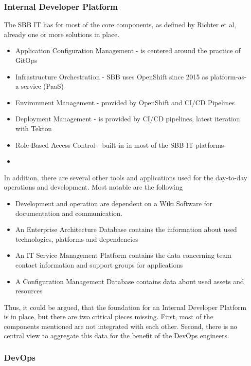 \documentclass[a4paper,12pt]{article}
\begin{document}
    \subsubsection{Internal Developer Platform}
    The SBB IT has for most of the core components, as defined by Richter et al\cite{richteretal}, already one or more solutions
    in place.
    \begin{itemize}
        \item Application Configuration Management - is centered around the practice of GitOps\cite{hashicorpvault}
        \item Infrastructure Orchestration - SBB uses OpenShift since 2015\cite{rhsbbopenshift} as platform-as-a-service (PaaS)
        \item Environment Management - provided by OpenShift and CI/CD Pipelines
        \item Deployment Management - is provided by CI/CD pipelines, latest iteration with Tekton\cite{sbbtekton}
        \item Role-Based Access Control - built-in in most of the SBB IT platforms
    \item \end{itemize}
    In addition, there are several other tools and applications used for the day-to-day operations and development.
    Most notable are the following
    \begin{itemize}
        \item Development and operation are dependent on a Wiki Software for documentation and communication.
        \item An Enterprise Architecture Database contains the information about used technologies, platforms and dependencies
        \item An IT Service Management Platform contains the data concerning team contact information and support groups for applications
        \item A Configuration Management Database contains data about used assets and resources
    \end{itemize}
    Thus, it could be argued, that the foundation for an Internal Developer Platform is in place, but there are two
    critical pieces missing.
    First, most of the components mentioned are not integrated with each other.
    Second, there is no central view to aggregate this data for the benefit of the DevOps engineers.

    \subsubsection{DevOps}
\end{document}
